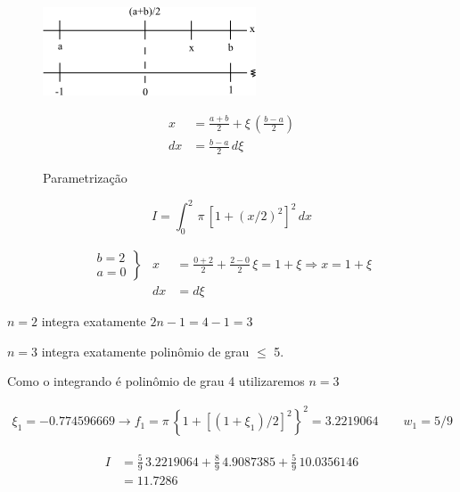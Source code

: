\begin{enumerate}
\begin{figure}[htb]
 \centering
 \begin{minipage}[c]{7cm}
    \includegraphics[scale=0.8]{capitulos/capitulo2/figuras/quadraturas_de_gauss1.png}
    \caption{Parametrização}
    \label{fig:quadraturas_de_gauss1}
 \end{minipage}\hspace*{1cm}
 \begin{minipage}[c]{6cm}
     \[
      \begin{array}{ll}
       x & = \displaystyle \frac{a+b}{2} + \xi \, \left(\frac{b-a}{2}\right) \\
       dx & = \displaystyle \frac{b-a}{2} \, d\xi
      \end{array}
     \]
 \end{minipage}
\end{figure}

\begin{example}
\[
 I = \int_0^2 \, \pi \, [1 + (x/2)^2]^2 \, dx
\]

\[
 \begin{array}{lll}
 \left.
 \begin{array}{l}
  b = 2 \\
  a = 0
 \end{array}
 \right\}
 & x & = \displaystyle \frac{0+2}{2} + \displaystyle \frac{2-0}{2} \, \xi = 1 + \xi \Rightarrow x = 1 + \xi \\
 & dx & = d\xi
 \end{array}
\]

$n=2$ integra exatamente $2n-1 = 4-1 = 3$

$n=3$ integra exatamente polinômio de grau $\leq$ 5.

Como o integrando é polinômio de grau 4 utilizaremos $n=3$

\[
\begin{array}{l}
 \xi_1 = - 0.774596669 \rightarrow f_1 = \pi \, \left\{ 1 + \left[ (1+\xi_1)/2 \right]^2 \right\}^2 = 3.2219064 \qquad w_1=5/9
\end{array}
\]

\[
\begin{array}{ll}
 I & = \displaystyle \frac{5}{9} \, 3.2219064 + \frac{8}{9} \, 4.9087385 + \frac{5}{9} \, 10.0356146 \\
   & = 11.7286
\end{array}
\]


\end{example}
\end{enumerate}
